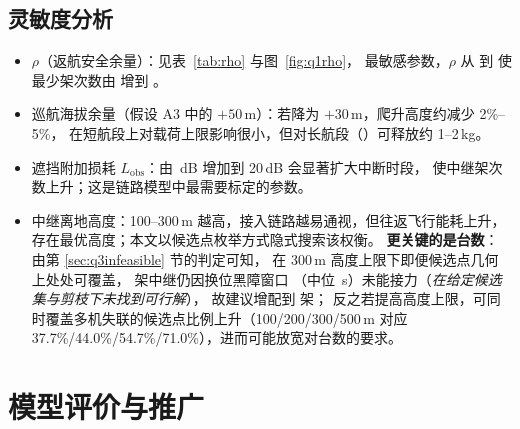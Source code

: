 \documentclass[12pt,a4paper,fontset=windows]{ctexart}
\begin{document}
\subsection{灵敏度分析}\label{sec:sens}
\begin{itemize}[leftmargin=2.2em,itemsep=2pt]
\item $\rho$（返航安全余量）：见表~\ref{tab:rho} 与图~\ref{fig:q1rho}，
      最敏感参数，$\rho$ 从 \QoneRhoLo 到 \QoneRhoHi 使最少架次数由 \QoneRhoSortiesLo 增到 \QoneRhoSortiesHi。
\item 巡航海拔余量（假设 A3 中的 $+50$\,m）：若降为 $+30$\,m，爬升高度约减少 2\%--5\%，
      在短航段上对载荷上限影响很小，但对长航段（\DemFarID）可释放约 1--2\,kg。
\item 遮挡附加损耗 $L_{\mathrm{obs}}$：由 \CommLobs\,dB 增加到 20\,dB 会显著扩大中断时段，
      使中继架次数上升；这是链路模型中最需要标定的参数。
\item 中继离地高度：100--300\,m 越高，接入链路越易通视，但往返飞行能耗上升，
      存在最优高度；本文以候选点枚举方式隐式搜索该权衡。
      \textbf{更关键的是台数}：由第 \ref{sec:q3infeasible} 节的判定可知，
      在 300\,m 高度上限下即便候选点几何上处处可覆盖，\RelayN{} 架中继仍因换位黑障窗口
      （中位 \QthreeDpBlackoutMedianS\,s）未能接力（\emph{在给定候选集与剪枝下未找到可行解}），
      故建议增配到 \QthreeNeedN{} 架；
      反之若提高高度上限，可同时覆盖多机失联的候选点比例上升（100/200/300/500\,m 对应
      37.7\%/44.0\%/54.7\%/71.0\%），进而可能放宽对台数的要求。
\end{itemize}

\section{模型评价与推广}
\end{document}
